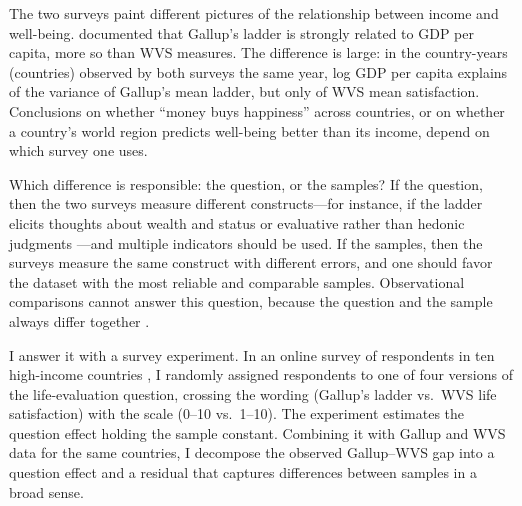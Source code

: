 \documentclass[12pt]{article}
\begin{document}
The two surveys paint different pictures of the relationship between income and well-being. \citet{deaton_income_2008} documented that Gallup's ladder is strongly related to GDP per capita, more so than WVS measures. The difference is large: in the \nCommon country-years (\nCommonCountries countries) observed by both surveys the same year, log GDP per capita explains \RtwoCommonGallup of the variance of Gallup's mean ladder, but only \RtwoCommonWVS of WVS mean satisfaction. Conclusions on whether ``money buys happiness'' across countries, or on whether a country's world region predicts well-being better than its income, depend on which survey one uses. 

Which difference is responsible: the question, or the samples? If the question, then the two surveys measure different constructs---for instance, if the ladder elicits thoughts about wealth and status \citep{nilsson_cantril_2024} or evaluative rather than hedonic judgments \citep{kahneman_high_2010}---and multiple indicators should be used. If the samples, then the surveys measure the same construct with different errors, and one should favor the dataset with the most reliable and comparable samples. Observational comparisons cannot answer this question, because the question and the sample always differ together \citep{bjornskov_how_2010}.

I answer it with a survey experiment. In an online survey of \nFabre respondents in ten high-income countries \citep{fabre_public_2025}, I randomly assigned respondents to one of four versions of the life-evaluation question, crossing the wording (Gallup's ladder vs.\ WVS life satisfaction) with the scale (0--10 vs.\ 1--10). The experiment estimates the question effect holding the sample constant. Combining it with Gallup and WVS data for the same countries, I decompose the observed Gallup--WVS gap into a question effect and a residual that captures differences between samples in a broad sense.
\end{document}
